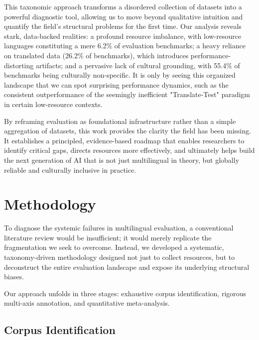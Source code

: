 \documentclass[acmsmall]{acmart}
\begin{document}
This taxonomic approach transforms a disordered collection of datasets into a powerful diagnostic tool, allowing us to move beyond qualitative intuition and quantify the field's structural problems for the first time. Our analysis reveals stark, data-backed realities: a profound resource imbalance, with low-resource languages constituting a mere 6.2\% of evaluation benchmarks; a heavy reliance on translated data (26.2\% of benchmarks), which introduces performance-distorting artifacts; and a pervasive lack of cultural grounding, with 55.4\% of benchmarks being culturally non-specific. It is only by seeing this organized landscape that we can spot surprising performance dynamics, such as the consistent outperformance of the seemingly inefficient "Translate-Test" paradigm in certain low-resource contexts.

By reframing evaluation as foundational infrastructure rather than a simple aggregation of datasets, this work provides the clarity the field has been missing. It establishes a principled, evidence-based roadmap that enables researchers to identify critical gaps, directs resources more effectively, and ultimately helps build the next generation of AI that is not just multilingual in theory, but globally reliable and culturally inclusive in practice.





\section{Methodology}

To diagnose the systemic failures in multilingual evaluation, a conventional literature review would be insufficient; it would merely replicate the fragmentation we seek to overcome. Instead, we developed a systematic, taxonomy-driven methodology designed not just to collect resources, but to deconstruct the entire evaluation landscape and expose its underlying structural biases.

Our approach unfolds in three stages: exhaustive corpus identification, rigorous multi-axis annotation, and quantitative meta-analysis.

\subsection{Corpus Identification}
\end{document}
